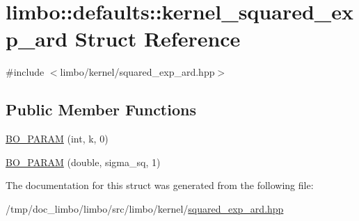 \hypertarget{structlimbo_1_1defaults_1_1kernel__squared__exp__ard}{}\section{limbo\+:\+:defaults\+:\+:kernel\+\_\+squared\+\_\+exp\+\_\+ard Struct Reference}
\label{structlimbo_1_1defaults_1_1kernel__squared__exp__ard}


{\ttfamily \#include $<$limbo/kernel/squared\+\_\+exp\+\_\+ard.\+hpp$>$}

\subsection*{Public Member Functions}
\begin{DoxyCompactItemize}
\item 
\hyperlink{group__kernel__defaults_ga913157eccae4e432cb2fd43ec682773c}{B\+O\+\_\+\+P\+A\+R\+A\+M} (int, k, 0)
\item 
\hyperlink{group__kernel__defaults_ga5322933a812efe2019e375cd2b4875fc}{B\+O\+\_\+\+P\+A\+R\+A\+M} (double, sigma\+\_\+sq, 1)
\end{DoxyCompactItemize}


The documentation for this struct was generated from the following file\+:\begin{DoxyCompactItemize}
\item 
/tmp/doc\+\_\+limbo/limbo/src/limbo/kernel/\hyperlink{squared__exp__ard_8hpp}{squared\+\_\+exp\+\_\+ard.\+hpp}\end{DoxyCompactItemize}
